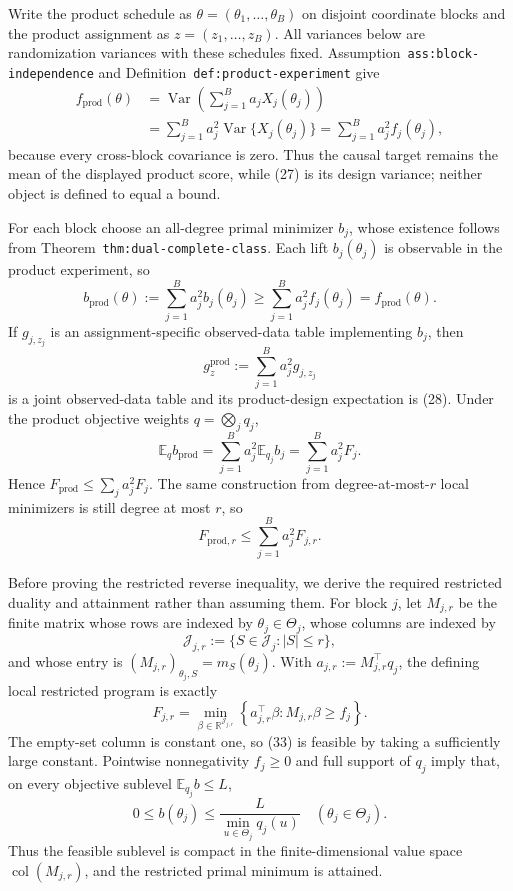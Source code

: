 Write the product schedule as \(\theta=(\theta_1,\ldots,\theta_B)\) on disjoint coordinate blocks and the product assignment as \(z=(z_1,\ldots,z_B)\).  All variances below are randomization variances with these schedules fixed.  Assumption~\texttt{ass:block-independence} and Definition~\texttt{def:product-experiment} give
\[
\begin{aligned}
f_{\mathrm{prod}}(\theta)
&=\operatorname{Var}\!\left(\sum_{j=1}^Ba_jX_j(\theta_j)\right)\\
&=\sum_{j=1}^Ba_j^2\operatorname{Var}\{X_j(\theta_j)\}
=\sum_{j=1}^Ba_j^2f_j(\theta_j),
\end{aligned}
\tag{27}
\]
because every cross-block covariance is zero.  Thus the causal target remains the mean of the displayed product score, while (27) is its design variance; neither object is defined to equal a bound.

For each block choose an all-degree primal minimizer \(b_j\), whose existence follows from Theorem~\texttt{thm:dual-complete-class}.  Each lift \(b_j(\theta_j)\) is observable in the product experiment, so
\[
b_{\mathrm{prod}}(\theta):=
\sum_{j=1}^Ba_j^2b_j(\theta_j)
\ge \sum_{j=1}^Ba_j^2f_j(\theta_j)
=f_{\mathrm{prod}}(\theta).
\tag{28}
\]
If \(g_{j,z_j}\) is an assignment-specific observed-data table implementing \(b_j\), then
\[
g_z^{\mathrm{prod}}:=\sum_{j=1}^Ba_j^2g_{j,z_j}
\tag{29}
\]
is a joint observed-data table and its product-design expectation is (28).  Under the product objective weights \(q=\bigotimes_jq_j\),
\[
\mathbb E_qb_{\mathrm{prod}}
=\sum_{j=1}^Ba_j^2\mathbb E_{q_j}b_j
=\sum_{j=1}^Ba_j^2F_j.
\tag{30}
\]
Hence \(F_{\mathrm{prod}}\le\sum_ja_j^2F_j\).  The same construction from degree-at-most-\(r\) local minimizers is still degree at most \(r\), so
\[
F_{\mathrm{prod},r}\le\sum_{j=1}^Ba_j^2F_{j,r}.
\tag{31}
\]

Before proving the restricted reverse inequality, we derive the required restricted duality and attainment rather than assuming them.  For block \(j\), let \(M_{j,r}\) be the finite matrix whose rows are indexed by \(\theta_j\in\Theta_j\), whose columns are indexed by
\[
\mathcal J_{j,r}:=\{S\in\mathcal J_j:|S|\le r\},
\tag{32}
\]
and whose entry is \((M_{j,r})_{\theta_j,S}=m_S(\theta_j)\).  With \(a_{j,r}:=M_{j,r}^{\top}q_j\), the defining local restricted program is exactly
\[
F_{j,r}
=\min_{\beta\in\mathbb R^{\mathcal J_{j,r}}}
\left\{a_{j,r}^{\top}\beta:
M_{j,r}\beta\ge f_j\right\}.
\tag{33}
\]
The empty-set column is constant one, so (33) is feasible by taking a sufficiently large constant.  Pointwise nonnegativity \(f_j\ge0\) and full support of \(q_j\) imply that, on every objective sublevel \(\mathbb E_{q_j}b\le L\),
\[
0\le b(\theta_j)\le \frac{L}{\min_{u\in\Theta_j}q_j(u)}
\quad(\theta_j\in\Theta_j).
\tag{34}
\]
Thus the feasible sublevel is compact in the finite-dimensional value space \(\operatorname{col}(M_{j,r})\), and the restricted primal minimum is attained.


